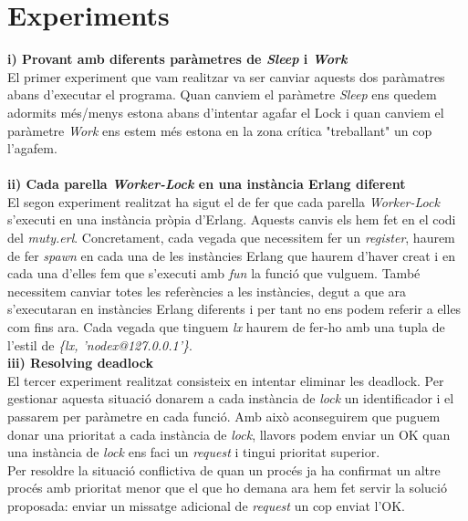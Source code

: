 \documentclass[a4paper, 10pt]{article}
\begin{document}
\section{Experiments}
\begin{itemize}
\textbf{i) Provant amb diferents paràmetres de \textit{Sleep} i \textit{Work}}\\
El primer experiment que vam realitzar va ser canviar aquests dos paràmatres abans d'executar el programa. Quan canviem el paràmetre \textit{Sleep} ens quedem adormits més/menys estona abans d'intentar agafar el Lock i quan canviem el paràmetre \textit{Work} ens estem més estona en la zona crítica "treballant" un cop l'agafem.
\\
\\
\textbf{ii) Cada parella \textit{Worker-Lock} en una instància Erlang diferent}\\
El segon experiment realitzat ha sigut el de fer que cada parella \textit{Worker-Lock} s'executi en una instància pròpia d'Erlang. Aquests canvis els hem fet en el codi del \textit{muty.erl}. Concretament, cada vegada que necessitem fer un \textit{register}, haurem de fer \textit{spawn} en cada una de les instàncies Erlang que haurem d'haver creat i en cada una d'elles fem que s'executi amb \textit{fun} la funció que vulguem. També necessitem canviar totes les referències a les instàncies, degut a que ara s'executaran en instàncies Erlang diferents i per tant no ens podem referir a elles com fins ara. Cada vegada que tinguem \textit{lx} haurem de fer-ho amb una tupla de l'estil de \textit{\{lx, 'nodex@127.0.0.1'\}}. 
\\
\textbf{iii) Resolving deadlock}\\
El tercer experiment realitzat consisteix en intentar eliminar les deadlock. Per gestionar aquesta situació donarem a cada instància de \textit{lock} un identificador i el passarem per paràmetre en cada funció. Amb això aconseguirem que puguem donar una prioritat a cada instància de \textit{lock}, llavors podem enviar un OK quan una instància de \textit{lock} ens faci un \textit{request} i tingui prioritat superior.\\
Per resoldre la situació conflictiva de quan un procés ja ha confirmat un altre procés amb prioritat menor que el que ho demana ara hem fet servir la solució proposada: enviar un missatge adicional de \textit{request} un cop enviat l'OK.

\end{itemize}

\begin{itemize}


\end{itemize}
\end{document}
